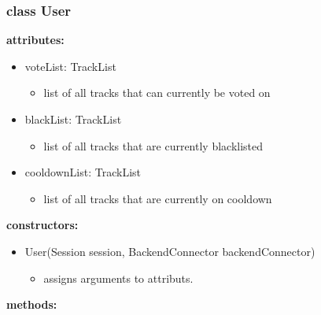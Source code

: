 \documentclass[oneside, nenglish]{sdqtechreport}
\begin{document}
\subsubsection{class User}
\textbf{attributes:}
\begin{itemize}
    \item voteList: TrackList
    \begin{itemize}
        \item list of all tracks that can currently be voted on
    \end{itemize}
    \item blackList: TrackList
    \begin{itemize}
        \item list of all tracks that are currently blacklisted
    \end{itemize}
    \item cooldownList: TrackList
    \begin{itemize}
        \item list of all tracks that are currently on cooldown
    \end{itemize}
\end{itemize}
\textbf{constructors:}
\begin{itemize}
    \item User(Session session, BackendConnector backendConnector)
    \begin{itemize}
        \item assigns arguments to attributs.
    \end{itemize}
\end{itemize}
\textbf{methods:}
\end{document}

